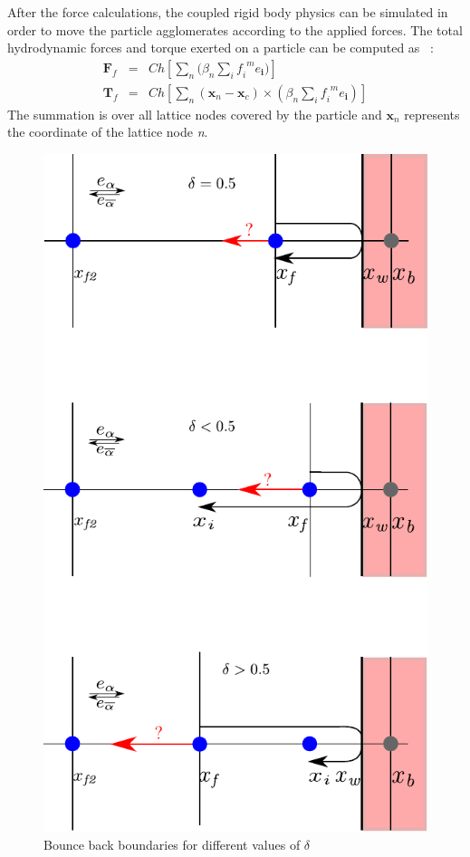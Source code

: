 After the force calculations, the coupled rigid body physics can be simulated in order to move the particle agglomerates according to the applied forces. The total hydrodynamic forces and torque exerted on a particle can be computed as ~\citep{Cook2004, Noble1998}:
\begin{eqnarray}
\mathbf{F}_{f} & = & \mathit{Ch}[\sum\limits_{\mathit{n}}{(\beta_{\mathit{n}} \sum\limits_{\mathit{i}}{\mathit{f_i}^{\mathit{ m}}\mathbf{\mathit{e}_i}}})] \\ 
\mathbf{T}_{f} & = & \mathit{Ch}[\sum\limits_{\mathit{n}}{(\mathbf{x}_{\mathit{n}}-\mathbf{x}_{\mathit{c}}) \times (\beta_{\mathit{n}} \sum\limits_{\mathit{i}}{\mathit{f_i}^{\mathit{ m}}\mathbf{\mathit{e}_i}})}]
\end{eqnarray}
The summation is over all lattice nodes covered by the particle and $\mathbf{x}_{\mathit{n}}$ represents the coordinate of the lattice node \textit{n}.
\begin{figure}[htbp]
\centering
\includegraphics[scale=1]{bouncemod}
\caption{Bounce back boundaries for different values of $\delta$}
\label{fig:bouncemod}
\end{figure}

